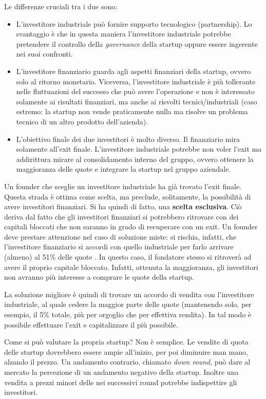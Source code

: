 Le differenze cruciali tra i due sono:
\begin{itemize}
 \item L'investitore industriale può fornire supporto tecnologico
 (partnership). Lo svantaggio è che in questa maniera l'investitore industriale
 potrebbe pretendere il controllo della \textit{governance} della startup oppure
 essere ingerente nei suoi confronti.
 \item L'investitore finanziario guarda agli aspetti finanziari della startup,
 ovvero solo al ritorno monetario. Viceversa, l'investitore industriale è più
 tollerante nelle fluttuazioni del successo che può avere l'operazione e non è
 interessato solamente ai risultati finanziari, ma anche ai risvolti
 tecnici/industriali (caso estremo: la startup non vende praticamente nulla ma
 risolve un problema tecnico di un altro prodotto dell'azienda).
 \item L'obiettivo finale dei due investitori è molto diverso. Il finanziario
 mira solamente all'exit finale. L'investitore industriale potrebbe non voler
 l'exit ma addirittura mirare al consolidamento interno del gruppo, ovvero
 ottenere la maggioranza delle quote e integrare la startup nel gruppo
 aziendale.
\end{itemize}

Un founder che sceglie un investitore industriale ha già trovato l'exit
finale.
Questa strada è ottima come scelta, ma preclude, solitamente, la possibilità di
avere investitori finanziari. Si ha quindi di fatto, una \textbf{scelta
esclusiva}. Ciò deriva dal fatto che gli investitori finanziari si potrebbero
ritrovare con dei capitali bloccati che non saranno in grado di recuperare con
un exit. Un founder deve prestare attenzione nel caso di soluzione miste: si
rischia, infatti, che l'investitore finanziario si accordi
con quello industriale per farlo arrivare (almeno) al 51\% delle quote . In
questo caso, il fondatore stesso si  ritroverà ad avere il proprio capitale
bloccato. Infatti, ottenuta la maggioranza, gli investitori non avranno più
interesse a comprare le quote della startup.

La soluzione migliore è quindi di trovare un accordo di vendita con
l'investitore industriale, al quale cedere la maggior parte delle quote
(mantenendo solo, per esempio, il 5\% totale, più per orgoglio che per
effettiva rendita). In tal modo è possibile effettuare l'exit e capitalizzare
il più possibile.

Come si può valutare la propria startup? Non è semplice. Le vendite di
quota delle startup dovrebbero essere ampie all'inizio, per poi diminuire man
mano, alzando il prezzo. Un andamento contrario, chiamato \textit{down round},
può dare al mercato la percezione di un andamento negativo della startup.
Inoltre una vendita a prezzi minori delle nei successivi round potrebbe
indispettire gli investitori.

